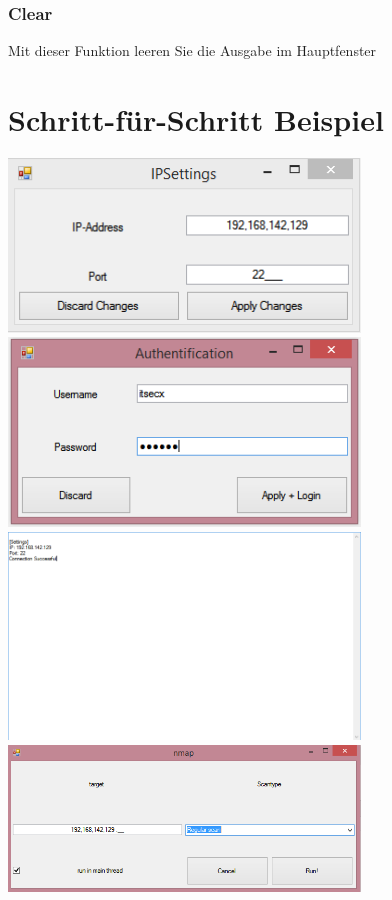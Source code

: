 \documentclass[11pt]{article} %
\begin{document}
\subsubsection{Clear}
Mit dieser Funktion leeren Sie die Ausgabe im Hauptfenster
\pagebreak
\section{Schritt-für-Schritt Beispiel}
\begin{center}
\includegraphics[width=0.7\textwidth]{IP_SETTINGS}\\
\includegraphics[width=0.7\textwidth]{VERBINDEN}\\
\includegraphics[width=0.7\textwidth]{afterlogin}\\
\includegraphics[width=0.7\textwidth]{bsp_nmap}\\

\end{center}
\end{document}
